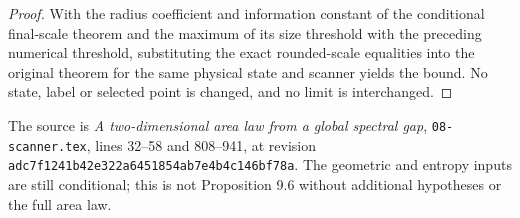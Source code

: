\begin{proof}
    \leanok
    With the radius coefficient and information constant of the
    conditional final-scale theorem and the maximum of its size threshold with
    the preceding numerical threshold, substituting the exact
    rounded-scale equalities into the original theorem for the same
    physical state and scanner yields the bound.  No state, label or selected point is
    changed, and no limit is interchanged.
\end{proof}

The source is \emph{A two-dimensional area law from a global spectral gap},
\texttt{08-scanner.tex}, lines 32--58 and 808--941, at revision
\texttt{adc7f1241b42e322a6451854ab7e4b4c146bf78a}.
The geometric and entropy inputs are still conditional; this is not
Proposition 9.6 without additional hypotheses or the full area law.
